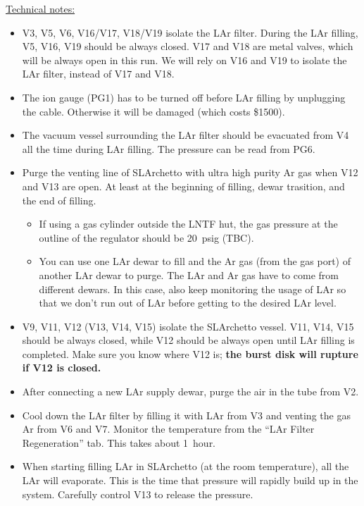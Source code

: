 \documentclass[letterpaper,11pt]{article}
\begin{document}
\underline{Technical notes:}
\begin{itemize}
\setlength\itemsep{-0.2em}
\item V3, V5, V6, V16/V17, V18/V19 isolate the LAr filter.
During the LAr filling, V5, V16, V19 should be always closed.
V17 and V18 are metal valves, which will be always open in this run.
We will rely on V16 and V19 to isolate the LAr filter, instead of V17 and V18.
\item The ion gauge (PG1) has to be turned off before LAr filling by unplugging the cable.
Otherwise it will be damaged (which costs \$1500).
\item The vacuum vessel surrounding the LAr filter should be evacuated from V4 all the time during LAr filling.  
The pressure can be read from PG6.
\item Purge the venting line of SLArchetto with ultra high purity Ar gas when V12 and V13 are open.
At least at the beginning of filling, dewar trasition, and the end of filling.
    \begin{itemize}
        \item If using a gas cylinder outside the LNTF hut, the gas pressure at the outline of the regulator 
        should be {\color{orange}20~psig (TBC)}.
        \item You can use one LAr dewar to fill and the Ar gas (from the gas port) of another LAr dewar to purge.
        The LAr and Ar gas have to come from different dewars.
        In this case, also keep monitoring the usage of LAr so that we don't run out of LAr before getting to
        the desired LAr level.
    \end{itemize}
\item V9, V11, V12 (V13, V14, V15) isolate the SLArchetto vessel.  
V11, V14, V15 should be always closed, while V12 should be always open until LAr filling is completed.  
Make sure you know where V12 is; \textbf{the burst disk will rupture if V12 is closed.}
\item After connecting a new LAr supply dewar, purge the air in the tube from V2.
\item Cool down the LAr filter by filling it with LAr from V3 and venting the gas Ar from V6 and V7.  
Monitor the temperature from the ``LAr Filter Regeneration'' tab.  This takes about 1~hour.
\item When starting filling LAr in SLArchetto (at the room temperature), all the LAr will evaporate.  
This is the time that pressure will rapidly build up in the system.  
Carefully control V13 to release the pressure.

\end{itemize}
\end{document}
